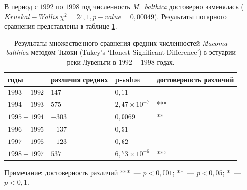 В период с $1992$ по $1998$ год численность {\it M.~balthica} достоверно изменялась ($Kruskal-Wallis\ \chi^2 = 24,1, p-value = 0,00049$). Результаты попарного сравнения представлены в таблице \ref{tab:Tukey_estuary_92_98_n2}.

	\begin{table}[p]
	\caption{Результаты множественного сравнения средних численностей {\it Macoma balthica} методом Тьюки (Tukey's ‘Honest Significant Difference’) в эстуарии реки Лувеньги в $1992-1998$ годах.}
	\label{tab:Tukey_estuary_92_98_n2}
	\begin{tabularx}{\textwidth}{|*{4}{X|}} \hline
	годы & различия средних & p-value & достоверность различий\\
	\hline
	$1993-1992$ & $147$ &  $0,11$ & \\
	\hline
	$1994-1993$ & $575$  & $2,47 \times 10^{-7}$ & *** \\
	\hline
	$1995-1994$ & $-303$  & $0,0069$ & ** \\
	\hline
	$1996-1995$ & $-137$  & $0,51$ & \\
	\hline
	$1997-1996$ & $-123$  & $0,62$ & \\
	\hline
	$1998-1997$ & $537$  & $6,73 \times 10^{-6}$ & *** \\
	\hline
	\end{tabularx}

	{\footnotesize Примечание: достоверность различий ***~--- $p<0,001$; **~--- $p<0,05$; *~--- $p<0,1$.}
	\end{table}

